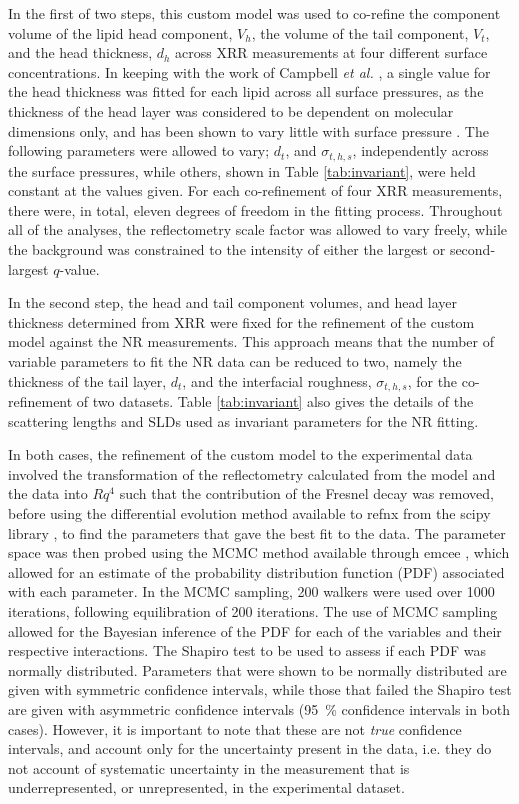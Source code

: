 \documentclass[amsmath,amssymb,twocolumn,superscriptaddress]{revtex4-1}
\begin{document}
In the first of two steps, this custom model was used to co-refine the component volume of the lipid head component, $V_h$, the volume of the tail component, $V_t$, and the head thickness, $d_h$ across XRR measurements at four different surface concentrations.
In keeping with the work of Campbell \emph{et al.} \cite{campbell_structure_2018}, a single value for the head thickness was fitted for each lipid across all surface pressures, as the thickness of the head layer was considered to be dependent on molecular dimensions only, and has been shown to vary little with surface pressure \cite{kewalramani_effects_2010}.
The following parameters were allowed to vary; $d_t$, and $\sigma_{t,h,s}$, independently across the surface pressures, while others, shown in Table \ref{tab:invariant}, were held constant at the values given.
For each co-refinement of four XRR measurements, there were, in total, eleven degrees of freedom in the fitting process.
Throughout all of the analyses, the reflectometry scale factor was allowed to vary freely, while the background was constrained to the intensity of either the largest or second-largest $q$-value.

In the second step, the head and tail component volumes, and head layer thickness determined from XRR were fixed for the refinement of the custom model against the NR measurements.
This approach means that the number of variable parameters to fit the NR data can be reduced to two, namely the thickness of the tail layer, $d_t$, and the interfacial roughness, $\sigma_{t,h,s}$, for the co-refinement of two datasets.
Table \ref{tab:invariant} also gives the details of the scattering lengths and SLDs used as invariant parameters for the NR fitting.

In both cases, the refinement of the custom model to the experimental data involved the transformation of the reflectometry calculated from the model and the data into $Rq^4$ such that the contribution of the Fresnel decay was removed, before using the differential evolution method available to refnx from the scipy library \cite{jones_scipy_2001}, to find the parameters that gave the best fit to the data.
The parameter space was then probed using the MCMC method available through emcee \cite{foreman-mackey_emcee_2013}, which allowed for an estimate of the probability distribution function (PDF) associated with each parameter.
In the MCMC sampling, 200 walkers were used over 1000 iterations, following equilibration of 200 iterations.
The use of MCMC sampling allowed for the Bayesian inference of the PDF for each of the variables and their respective interactions.
The Shapiro test to be used to assess if each PDF was normally distributed.
Parameters that were shown to be normally distributed are given with symmetric confidence intervals, while those that failed the Shapiro test are given with asymmetric confidence intervals (\SI{95}{\percent} confidence intervals in both cases).
However, it is important to note that these are not \emph{true} confidence intervals, and account only for the uncertainty present in the data, i.e. they do not account of systematic uncertainty in the measurement that is underrepresented, or unrepresented, in the experimental dataset.
\end{document}
